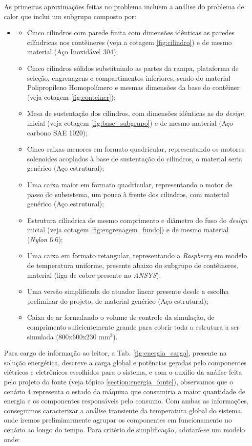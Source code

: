 As primeiras aproximações feitas no problema incluem a análise do problema de calor que inclui um subgrupo composto por:
\begin{itemize}
    \item []
    \begin{itemize}
        \item Cinco cilindros com parede finita com dimensões idênticas as paredes cilíndricas nos contêineres (veja a cotagem \ref{fig:cilindro}) e de mesmo material (Aço Inoxidável 304);
        \item Cinco cilindros sólidos substituindo as partes da rampa, plataforma de seleção, engrenagens e compartimentos inferiores, sendo do material Polipropileno Homopolímero e mesmas dimensões da base do contêiner (veja cotagem \ref{fig:conteiner});
        \item Mesa de sustentação dos cilindros, com dimensões idênticas as do \textit{design} inicial (veja cotagem \ref{fig:base_subgrupo}) e de mesmo material (Aço carbono SAE 1020);
        \item Cinco caixas menores em formato quadricular, representando os motores solenoides acoplados à base de sustentação do cilindros, o material seria genérico (Aço estrutural);
        \item Uma caixa maior em formato quadricular, representando o motor de passo do subsistema, um pouco à frente dos cilindros, com material genérico (Aço estrutural);
        \item Estrutura cilíndrica de mesmo comprimento e diâmetro do fuso do \textit{design} inicial (veja cotagem \ref{fig:engrenagem_fundo}) e de mesmo material (\textit{Nylon} 6.6);
        \item Uma caixa em formato retangular, representando a \textit{Raspberry} em modelo de temperatura uniforme, presente abaixo do subgrupo de contêineres, material (liga de cobre presente no \textit{ANSYS});
        \item Uma versão simplificada do atuador linear presente desde a escolha preliminar do projeto, de material genérico (Aço estrutural);
        \item Caixa de ar formulando o volume de controle da simulação, de comprimento suficientemente grande para cobrir toda a estrutura a ser simulada (800x600x230 mm$^3$).
    \end{itemize}
\end{itemize}

Para cargo de informação ao leitor, a Tab. \ref{fig:energia_carga}, presente na solução energética, descreve a carga global e potências geradas pelo componentes elétricos e eletrônicos escolhidos para o sistema, e com o auxílio da análise feita pelo projeto da fonte (veja tópico \ref{section:energia_fonte}), observamos que o cenário 4 representa o estado da máquina que consumiria a maior quantidade de energia e os componentes responsáveis pelo consumo. Com ambas as informações, conseguimos caracterizar a análise transiente da temperatura global do sistema, onde iremos preliminarmente agrupar os componentes em funcionamento no cenário ao longo do tempo. Para critério de simplificação, adotará-se um modelo onde:

